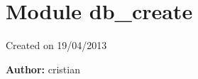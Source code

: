 %
%
%


\section{Module db\_create}

    \label{db_create}
Created on 19/04/2013

\textbf{Author:} cristian



